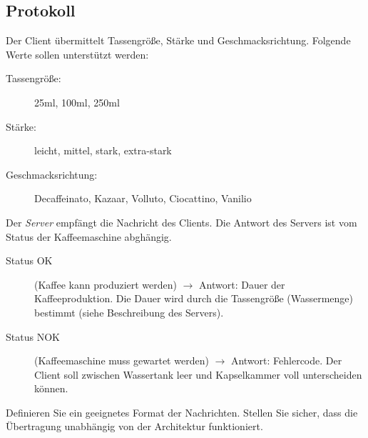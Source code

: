\subsection*{Protokoll}
\label{sec:prot}
Der Client übermittelt Tassengröße, Stärke und Geschmacksrichtung. Folgende
Werte sollen unterstützt werden:
%
\begin{description}
\item[Tassengröße:] 25ml, 100ml, 250ml
\item[Stärke:] leicht, mittel, stark, extra-stark
\item[Geschmacksrichtung:] Decaffeinato, Kazaar, Volluto, Ciocattino, Vanilio
\end{description}

Der \emph{Server} empfängt die Nachricht des Clients. Die Antwort des Servers ist vom Status der Kaffeemaschine abghängig.
%
\begin{description}
\item[Status OK] (Kaffee kann produziert werden) $\rightarrow$ Antwort: Dauer
  der Kaffeeproduktion. Die Dauer wird durch die Tassengröße (Wassermenge)
  bestimmt (siehe Beschreibung des Servers).
\item[Status NOK] (Kaffeemaschine muss gewartet werden) $\rightarrow$ Antwort:
  Fehlercode. Der Client soll zwischen Wassertank leer und Kapselkammer voll
  unterscheiden können.
\end{description}

Definieren Sie ein geeignetes Format der Nachrichten. Stellen Sie sicher, dass
die Übertragung unabhängig von der Architektur funktioniert.


\osueguidelinesone




